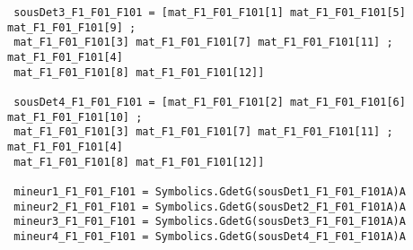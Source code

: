 \begin{lstlisting}
 sousDet3_F1_F01_F101 = [mat_F1_F01_F101[1] mat_F1_F01_F101[5] mat_F1_F01_F101[9] ;
 mat_F1_F01_F101[3] mat_F1_F01_F101[7] mat_F1_F01_F101[11] ; mat_F1_F01_F101[4]
 mat_F1_F01_F101[8] mat_F1_F01_F101[12]]

 sousDet4_F1_F01_F101 = [mat_F1_F01_F101[2] mat_F1_F01_F101[6] mat_F1_F01_F101[10] ;
 mat_F1_F01_F101[3] mat_F1_F01_F101[7] mat_F1_F01_F101[11] ; mat_F1_F01_F101[4]
 mat_F1_F01_F101[8] mat_F1_F01_F101[12]]
 
 mineur1_F1_F01_F101 = Symbolics.GdetG(sousDet1_F1_F01_F101A)A
 mineur2_F1_F01_F101 = Symbolics.GdetG(sousDet2_F1_F01_F101A)A
 mineur3_F1_F01_F101 = Symbolics.GdetG(sousDet3_F1_F01_F101A)A
 mineur4_F1_F01_F101 = Symbolics.GdetG(sousDet4_F1_F01_F101A)A
\end{lstlisting}
